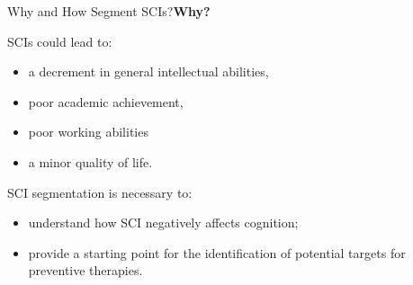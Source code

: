 \documentclass[]{standalone}
\begin{document}
	\begin{frame}{Why and How Segment SCIs?}{\textbf{Why?}}
	\normalsize
	\vspace{-25pt}
		\begin{exampleblock}{SCIs could lead to:}
			 \begin{itemize}
			 	\item a decrement in general intellectual abilities, 
			 	\item poor academic achievement, 
			 	\item poor working abilities
			 	\item a minor quality of life.
			 \end{itemize}
		\end{exampleblock}
		\vspace{10pt}
		\begin{block}{SCI segmentation is necessary to:}
			\begin{itemize}
				\item understand how SCI negatively affects cognition;
				\item provide a starting point for the identification of potential targets for preventive therapies.
			\end{itemize}
		\end{block}

	\end{frame}
\end{document}
